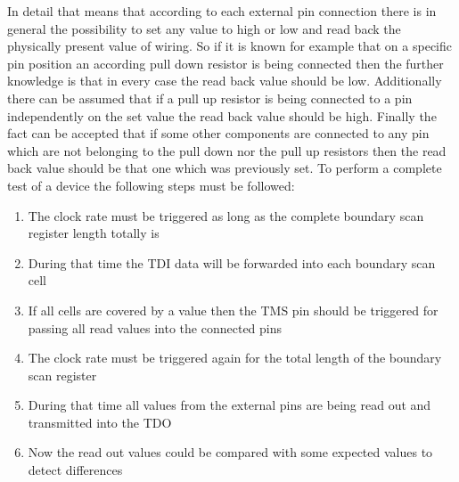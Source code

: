 In detail that means that according to each external pin connection there is in general the possibility to set any value to high or low and read back the physically present value of wiring. So if it is known for example that on a specific pin position an according pull down resistor is being connected then the further knowledge is that in every case the read back value should be low. Additionally there can be assumed that if a pull up resistor is being connected to a pin independently on the set value the read back value should be high. Finally the fact can be accepted that if some other components are connected to any pin which are not belonging to the pull down nor the pull up resistors then the read back value should be that one which was previously set. To perform a complete test of a device the following steps must be followed:
\begin{enumerate}
	\item The clock rate must be triggered as long as the complete boundary scan register length totally is\cite{R.C.CoferandBenjaminF.Harding.2006}
	\item During that time the TDI data will be forwarded into each boundary scan cell
	\item If all cells are covered by a value then the TMS pin should be triggered for passing all read values into the connected pins
	\item The clock rate must be triggered again for the total length of the boundary scan register
	\item During that time all values from the external pins are being read out and transmitted into the TDO
	\item Now the read out values could be compared with some expected values to detect differences
\end{enumerate}

